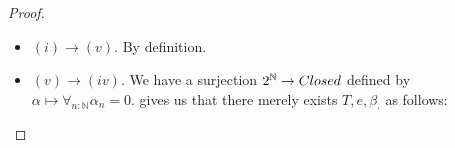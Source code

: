 \begin{proof}
\begin{itemize}
%     
%
%
%
%
%
%
%
%
%
%
%
%
   \item $(i) \to (v)$. By definition.
   \item $(v) \to (iv)$.
     We have a surjection $2^\N\to\Closed$ defined by $\alpha \mapsto \forall_{n:\mathbb N} \alpha_n = 0.$
     gives us that there merely exists $T, e, \beta_\cdot$ as follows:

\end{itemize}
\end{proof}
